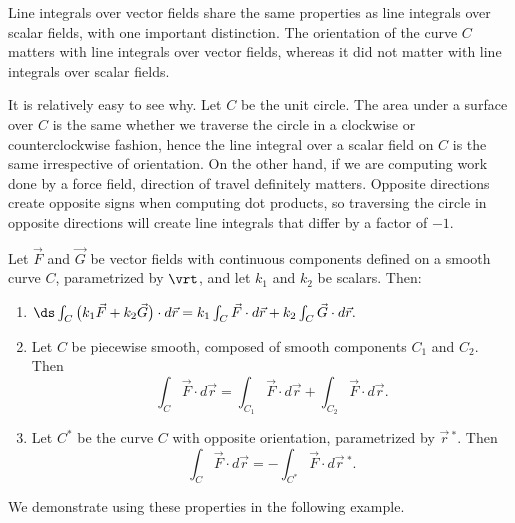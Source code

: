 Line integrals over vector fields share the same properties as line integrals over scalar fields, with one important distinction. The orientation of the curve $C$ matters with line integrals over vector fields, whereas it did not matter with line integrals over scalar fields.

It is relatively easy to see why. Let $C$ be the unit circle. The area under a surface over $C$ is the same whether we traverse the circle in a clockwise or counterclockwise fashion, hence the line integral over a scalar field on $C$ is the same irrespective of orientation. On the other hand, if we are computing work done by a force field, direction of travel definitely matters. Opposite directions create opposite signs when computing dot products, so traversing the circle in opposite directions will create line integrals that differ by a factor of $-1$. 

{Let $\vec F$ and $\vec G$ be  vector fields with continuous components defined on a smooth curve $C$, parametrized by $\vrt$, and let $k_1$ and $k_2$ be scalars. Then:
\begin{enumerate}
	\item	$\ds \int_C\big(k_1\vec F+k_2\vec G\big)\cdot d\vec r = k_1\int_C\vec F\cdot d\vec r +k_2\int_C\vec G\cdot d\vec r.$
	\item Let $C$ be piecewise smooth, composed of smooth components $C_1$ and $C_2$. Then
	$$\int_C\vec F\cdot d\vec r = \int_{C_1}\vec F\cdot d\vec r + \int_{C_2}\vec F\cdot d\vec r.$$
	\item	Let $C^*$ be the curve $C$ with opposite orientation, parametrized by $\vec r\,^*$. Then
	$$\int_C\vec F\cdot d\vec r = -\int_{C^*}\vec F\cdot d\vec r\,^*.$$
	\end{enumerate}
}

We demonstrate using these properties in the following example.\\


